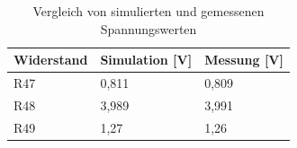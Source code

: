 \begin{table}[h]
    \centering
    \begin{tabular}{|l|l|l|}
        \hline
        \textbf{Widerstand} & \textbf{Simulation [V]} & \textbf{Messung [V]} \\
        \hline
        R47 & 0{,}811 & 0{,}809 \\
        \hline
        R48 & 3{,}989 & 3{,}991 \\
        \hline
        R49 & 1{,}27  & 1{,}26 \\
        \hline
    \end{tabular}
    \caption{Vergleich von simulierten und gemessenen Spannungswerten}
\end{table}

\clearpage
